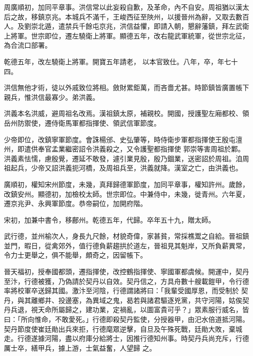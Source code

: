 \begin{pinyinscope}
 周廣順初，加同平章事。洪信常以此妄殺自歉，及革命，內不自安。周祖猶以漢太后之故，移鎮京兆。本城兵不滿千，王峻西征至陜州，以援晉州為辭，又取去數百人。及劉崇北遁，遣禁兵千餘屯京兆，洪信益懼，即請入朝，懇辭藩鎮，拜左武衛上將軍。世宗即位，遷左驍衛上將軍。顯德五年，改右龍武軍統軍，從世宗北征，為合流口部署。



 乾德五年，改左驍衛上將軍。開寶五年請老，
 以本官致仕。八年，卒，年七十四。



 洪信無他才術，徒以外戚致位將相。斂財累鉅萬，而吝嗇尤甚。時節鎮皆廣置帳下親兵，惟洪信最寡少。弟洪義。



 洪義本名洪威，避周祖名改焉。漢祖鎮太原，補親校。開國，授護聖左廂都校、領岳州防禦使，遷侍衛馬軍都指揮使、領武信軍節度。



 少帝即位，改鎮寧軍節度。會誅楊邠、史弘肇等，時侍衛步軍都指揮使王殷屯澶州，即遣供奉官孟業繼密詔令洪義殺之，又令護聖都指揮使
 郭崇等害周祖於鄴。洪義素怯懦，慮殷覺，遷延不敢發，遽引業見殷，殷乃錮業，送密詔於周祖。洎周祖起兵，少帝又詔洪義扼河橋，及周祖兵至，洪義就降。漢室之亡，由洪義也。



 廣順初，權知宋州節度，未幾，真拜歸德軍節度，加同平章事，權知許州。歲餘，改鎮安州。顯德初，加檢校太師。世宗即位。中兼侍中，未幾，徙青州。六年夏，遷京兆尹、永興軍節度。恭帝嗣位，加開府階。



 宋初，加兼中書令，移鄜州。乾德五年，代歸。卒年五十九，贈太師。



 武行德，並州榆次人，身長九尺餘，材貌奇偉，家甚貧，常採樵鬻之自給。晉祖鎮並門，暇日，從禽郊外，值行德負薪趨拱於道左，晉祖見其魁岸，又所負薪異常，令力士更舉之，俱不能舉，頗奇之，因留帳下。



 晉天福初，授奉國都頭，遷指揮使，改控鶴指揮使、寧國軍都虞候。開運中，契丹至汴，行德被獲，乃偽請於契丹以自效。契丹信之，方具舟數十艘載鎧甲，令行德率將校軍卒送歸其國。激汴至河陰，行德謂諸將曰：「我輩受國厚恩，而受制於
 契丹，與其離鄉井、投邊塞，為異域之鬼，曷若與諸君驅逐兇黨，共守河陽，姑俟契丹兵退，視天命所屬歸之，建功業，定禍亂，以圖富貴可乎？」眾素服行威名，皆曰：「所向惟命，不敢愛死。」行德即殺契丹監使，分授器甲，由汜水倍道抵河陽。契丹節度使崔廷勛出兵來拒，行德麾眾逆擊，自旦及午殊死戰，廷勛大敗，棄城走。行德遂據河陽，盡以府庫分給將士，因推行德知州事。時契丹兵尚充斥，行德厲士卒，繕甲兵，據上游，士氣益奮，人望歸
 之。




\end{pinyinscope}

